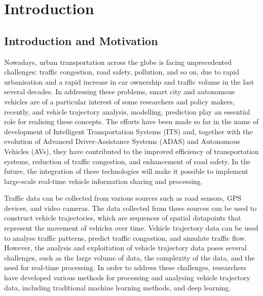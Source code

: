 \documentclass[11pt]{uonthesis}
\begin{document}
\chapter{Introduction}

\section{Introduction and Motivation}
Nowadays, urban transportation across the globe is facing unprecedented challenges: traffic congestion, road safety, pollution, and so on, due to rapid urbanisation and a rapid increase in car ownership and traffic volume in the last several decades. In addressing these problems, smart city and autonomous vehicles are of a particular interest of some researchers and policy makers, recently, and vehicle trajectory analysis, modelling, prediction play an essential role for realising these concepts. The efforts have been made so far in the name of development of Intelligent Transportation Systems (ITS) and, together with the evolution of Advanced Driver-Assistance Systems (ADAS) and Autonomous Vehicles (AVs), they have contributed to the improved efficiency of transportation systems, reduction of traffic congestion, and enhancement of road safety. In the future, the integration of these technologies will make it possible to implement large-scale real-time vehicle information sharing and processing. 

Traffic data can be collected from various sources such as road sensors, GPS devices, and video cameras. The data collected from these sources can be used to construct vehicle trajectories, which are sequences of spatial datapoints that represent the movement of vehicles over time. Vehicle trajectory data can be used to analyse traffic patterns, predict traffic congestion, and simulate traffic flow. However, the analysis and exploitation of vehicle trajectory data poses several challenges, such as the large volume of data, the complexity of the data, and the need for real-time processing. In order to address these challenges, researchers have developed various methods for processing and analysing vehicle trajectory data, including traditional machine learning methods, and deep learning. 
\end{document}
